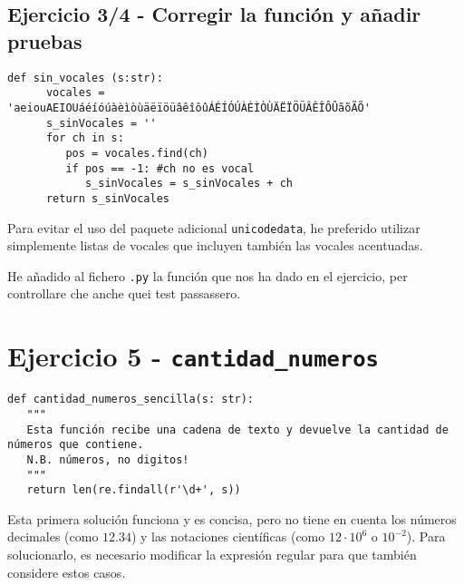 \subsection{Ejercicio 3/4 - Corregir la función y añadir pruebas}

\begin{lstlisting}[captionpos=b,caption={\lstinline|sin_vocales()| corregida}, label={code:sin_vocales}]
   def sin_vocales (s:str):
      vocales = 'aeiouAEIOUáéíóúàèìòùäëïöüâêîôûÁÉÍÓÚÀÈÌÒÙÄËÏÖÜÂÊÎÔÛãõÃÕ'
      s_sinVocales = ''
      for ch in s:
         pos = vocales.find(ch)
         if pos == -1: #ch no es vocal
            s_sinVocales = s_sinVocales + ch
      return s_sinVocales
\end{lstlisting}

Para evitar el uso del paquete adicional \lstinline{unicodedata}, he preferido utilizar simplemente listas de vocales que incluyen también las vocales acentuadas.

He añadido al fichero \texttt{.py} la función que nos ha dado en el ejercicio, per controllare che anche quei test passassero.

\newpage
\section{Ejercicio 5 - \texttt{cantidad\_numeros}}
\begin{lstlisting}[captionpos=b,caption={Solución sencilla}]
def cantidad_numeros_sencilla(s: str):
   """
   Esta función recibe una cadena de texto y devuelve la cantidad de números que contiene.
   N.B. números, no digitos!
   """
   return len(re.findall(r'\d+', s))
\end{lstlisting}

Esta primera solución funciona y es concisa, pero no tiene en cuenta los números decimales (como $12.34$) y las notaciones científicas (como $12\cdot 10^6$ o $10^{-2}$). 
Para solucionarlo, es necesario modificar la expresión regular para que también considere estos casos.

